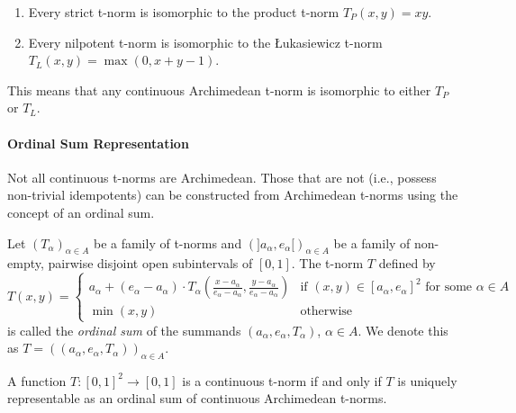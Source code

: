 \begin{proposition}
  \begin{enumerate}
      \item Every strict t-norm is isomorphic to the product t-norm $T_P(x,y) = xy$.
      \item Every nilpotent t-norm is isomorphic to the Łukasiewicz t-norm $T_L(x,y) = \max(0, x+y-1)$.
  \end{enumerate}
  This means that any continuous Archimedean t-norm is isomorphic to either $T_P$ or $T_L$.
\end{proposition}

\paragraph{Ordinal Sum Representation}
Not all continuous t-norms are Archimedean. Those that are not (i.e., possess non-trivial idempotents) can be constructed from Archimedean t-norms using the concept of an ordinal sum.

\begin{definition}
Let $(T_\alpha)_{\alpha \in A}$ be a family of t-norms and $(]a_\alpha, e_\alpha[)_{\alpha \in A}$ be a family of non-empty, pairwise disjoint open subintervals of $[0,1]$. The t-norm $T$ defined by
\[
T(x,y) =
\begin{cases}
  a_\alpha + (e_\alpha - a_\alpha) \cdot T_\alpha \left( \frac{x-a_\alpha}{e_\alpha - a_\alpha}, \frac{y-a_\alpha}{e_\alpha - a_\alpha} \right) & \text{if } (x,y) \in [a_\alpha, e_\alpha]^2 \text{ for some } \alpha \in A \\
  \min(x,y) & \text{otherwise}
\end{cases}
\]
is called the \emph{ordinal sum} of the summands $(a_\alpha, e_\alpha, T_\alpha)$, $\alpha \in A$.
We denote this as $T = ((a_\alpha, e_\alpha, T_\alpha))_{\alpha \in A}$.
\end{definition}

\begin{theorem}
  A function $T: [0,1]^2 \to [0,1]$ is a continuous t-norm if and only if $T$ is uniquely representable as an ordinal sum of continuous Archimedean t-norms.
\end{theorem}

